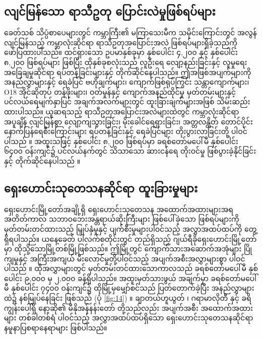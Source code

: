 \documentclass[10pt,twocolumn,letterpaper]{article}
\begin{document}
\subsection{လျင်မြန်သော ရာသီဥတု ပြောင်းလဲမှုဖြစ်ရပ်များ}

ခေတ်သစ် သိပ္ပံစာပေများတွင် ကမ္ဘာကြီး၏ မကြာသေးမီက သမိုင်းကြောင်းတွင် အလွန်လျင်မြန်သည့် ကမ္ဘာလုံးဆိုင်ရာ ရာသီဥတုအပြောင်းအလဲ ဖြစ်ရပ်များရှိခဲ့သည်ကို ဖော်ပြထားပါသည်။ ထင်ရှားသော ဥပမာနှစ်ခုမှာ နှစ်ပေါင်း ၄,၂၀၀ နှင့် နှစ်ပေါင်း ၈,၂၀၀ ဖြစ်ရပ်များ ဖြစ်ပြီး ထိုနှစ်ခုစလုံးသည် လူဦးရေ လျော့နည်းခြင်းနှင့် လူမှုရေးအခြေချမှုဆိုင်ရာ ရပ်တန့်ခြင်းများနှင့် တိုက်ဆိုင်နေပါသည်။ ဤအဖြစ်အပျက်များကို အနည်လွှာများနှင့် ရေခဲပြင် ဗဟိုချက်များ၊ ကျောက်ဖြစ်ရုပ်ကြွင်း  သန္တာကျောက်များ၊ O18 အိုင်ဆိုတုပ် တန်ဖိုးများ၊ ဝတ်မှုန်နှင့် ကျောက်အနည်ထိုင်မှု မှတ်တမ်းများနှင့် ပင်လယ်ရေမျက်နှာပြင် အချက်အလက်များတွင် ထူးခြားချက်များအဖြစ် သိမ်းဆည်းထားပါသည်။ ယူဆရသည့် ရာသီဥတုအပြောင်းအလဲများထဲတွင် ကမ္ဘာလုံးဆိုင်ရာ အပူချိန် လျင်မြန်စွာ လျော့ကျသွားခြင်း၊ မိုးခေါင်ရေရှားခြင်း၊ အတ္တလန္တိတ် တောင်ပိုင်း နောက်ပြန်ရေစီးကြောင်းများ ရပ်တန့်ခြင်းနှင့် ရေခဲပြင်များ တိုးပွားလာခြင်းတို့ ပါဝင်ပါသည် \cite{90,91,92}။ အထူးသဖြင့် နှစ်ပေါင်း ၈,၂၀၀ ဖြစ်ရပ်မှာ ခရစ်တော်မပေါ်မီ နှစ်ပေါင်း ၆၄၀၀ ဝန်းကျင်၌ ပင်လယ်နက်တွင် သိသာသော ဆားငန်ရေ တိုးဝင်မှု ဖြစ်ပွားခဲ့နိုင်ခြင်းနှင့် တိုက်ဆိုင်နေပါသည် \cite{93}။

\subsection{ရှေးဟောင်းသုတေသနဆိုင်ရာ ထူးခြားမှုများ}

ရှေးဟောင်းမြို့တော်အချို့ရှိ ရှေးဟောင်းသုတေသန အထောက်အထားများအရ အတိတ်ကာလ သဘာဝဘေးအန္တရာယ်ဆိုးကြီးများ ဖြစ်ပေါ်ခဲ့သော ဖြစ်ရပ်များကို မှတ်တမ်းတင်ထားသည့် မြှုပ်နှံမှုနှင့် ပျက်စီးမှုများပါဝင်သည့် အလွှာအထပ်ထပ်ကို တွေ့ရှိရပါသည်။ ယနေ့ခေတ် ပါလက်စတိုင်းတွင် တည်ရှိသည့် ဂျယ်ရီခိုရှေးဟောင်းမြို့တော်မှာ ထိုသို့သောမြို့တစ်မြို့ဖြစ်သည်။ ဤမြို့တွင် ကျောက်သားအဆောက်အအုံများ ပြိုကျမှုနှင့် အကြီးအကျယ် မီးလောင်မှုတို့ပါဝင်သည့် အပျက်အစီးအလွှာများစွာ ပါဝင်ပါသည် \cite{96,97}။ ထိုအလွှာများတွင် မှတ်တမ်းတင်ထားသောကာလသည် ခရစ်တော်မပေါ်မီ နှစ်ပေါင်း ၉,၀၀၀ မှ ၂,၀၀၀ ခန့်ရှိပါသည်။ အထူးမှတ်သားဖွယ် အချက်မှာ ခရစ်တော်မပေါ်မီ နှစ်ပေါင်း ၇၄၀၀ ဝန်းကျင်၌ ထိုမြို့မှမျှော်စင်သည် ပြတ်တောက်ခဲ့ပြီး အနည်လွှာများထဲ၌ နစ်မြုပ်နေခြင်း ဖြစ်သည် (ပုံ \ref{fig:14}) \cite{95}။ ချာတယ်ဟူယွတ် \cite{99}၊ ဂရာမာလိုတီ \cite{98} နှင့် ခရိကျွန်းပေါ်ရှိ နော့ဆို၏ မီနိုအန်နန်းတော် \cite{100,101} တို့သည်လည်း အပျက်အစီး အထောက်အထားများ တစ်ခါတစ်ရံ ပါဝင်သည့် အလွှာအထပ်ထပ်ရှိသော ရှေးဟောင်းသုတေသနဆိုင်ရာ နမူနာပြစရာနေရာများ ဖြစ်ပါသည်။
\end{document}
